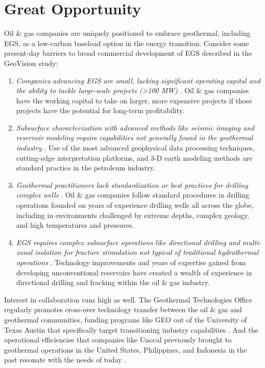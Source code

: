 \section{Great Opportunity}\label{ch7:opportunity}
Oil \& gas companies are uniquely positioned to embrace geothermal, including EGS, as a low-carbon baseload option in the energy transition. Consider some present-day barriers to broad commercial development of EGS described in the GeoVision study: 
\begin{enumerate}
    \item \textit{Companies advancing EGS are small, lacking significant operating capital and the ability to tackle large-scale projects (>100 MW)} \citep{doughty_geovision_2018}. Oil \& gas companies have the working capital to take on larger, more expensive projects if those projects have the potential for long-term profitability.
    \item \textit{Subsurface characterization with advanced methods like seismic imaging and reservoir modeling require capabilities not generally found in the geothermal industry} \citep{doughty_geovision_2018}. Use of the most advanced geophysical data processing techniques, cutting-edge interpretation platforms, and 3-D earth modeling methods are standard practice in the petroleum industry.
    \item \textit{Geothermal practitioners lack standardization or best practices for drilling complex wells} \citep{doughty_geovision_2018}. Oil \& gas companies follow standard procedures in drilling operations founded on years of experience drilling wells all across the globe, including in environments challenged by extreme depths, complex geology, and high temperatures and pressures.
    \item \textit{EGS requires complex subsurface operations like directional drilling and multi-zonal isolation for fracture stimulation not typical of traditional hydrothermal operations} \citep{augustine_geovision_2019}. Technology improvements and years of expertise gained from developing unconventional reservoirs have created a wealth of experience in directional drilling and fracking within the oil \& gas industry.
\end{enumerate}

Interest in collaboration runs high as well. The Geothermal Technologies Office regularly promotes cross-over technology transfer between the oil \& gas and geothermal communities, funding programs like GEO out of the University of Texas Austin that specifically target transitioning industry capabilities \citep{hamm_geothermal_2021}. And the operational efficiencies that companies like Unocal previously brought to geothermal operations in the United States, Philippines, and Indonesia in the past resonate with the needs of today \citep{melosh_geothermal_2017,palma_dynamic_2014}.

